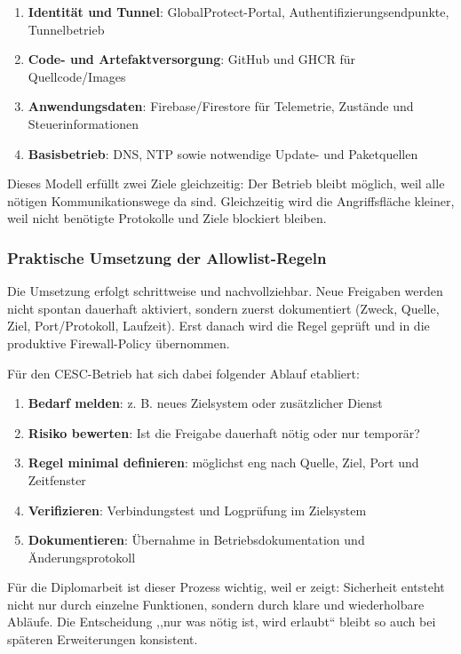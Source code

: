 \begin{enumerate}
    \item \textbf{Identität und Tunnel}: GlobalProtect-Portal, Authentifizierungsendpunkte, Tunnelbetrieb
    \item \textbf{Code- und Artefaktversorgung}: GitHub und GHCR für Quellcode/Images
    \item \textbf{Anwendungsdaten}: Firebase/Firestore für Telemetrie, Zustände und Steuerinformationen
    \item \textbf{Basisbetrieb}: DNS, NTP sowie notwendige Update- und Paketquellen
\end{enumerate}

Dieses Modell erfüllt zwei Ziele gleichzeitig: Der Betrieb bleibt möglich, weil alle nötigen Kommunikationswege da sind. Gleichzeitig wird die Angriffsfläche kleiner, weil nicht benötigte Protokolle und Ziele blockiert bleiben.

\subsubsection{Praktische Umsetzung der Allowlist-Regeln}

Die Umsetzung erfolgt schrittweise und nachvollziehbar. Neue Freigaben werden nicht spontan dauerhaft aktiviert, sondern zuerst dokumentiert (Zweck, Quelle, Ziel, Port/Protokoll, Laufzeit). Erst danach wird die Regel geprüft und in die produktive Firewall-Policy übernommen.

Für den CESC-Betrieb hat sich dabei folgender Ablauf etabliert:

\begin{enumerate}
    \item \textbf{Bedarf melden}: z. B. neues Zielsystem oder zusätzlicher Dienst
    \item \textbf{Risiko bewerten}: Ist die Freigabe dauerhaft nötig oder nur temporär?
    \item \textbf{Regel minimal definieren}: möglichst eng nach Quelle, Ziel, Port und Zeitfenster
    \item \textbf{Verifizieren}: Verbindungstest und Logprüfung im Zielsystem
    \item \textbf{Dokumentieren}: Übernahme in Betriebsdokumentation und Änderungsprotokoll
\end{enumerate}

Für die Diplomarbeit ist dieser Prozess wichtig, weil er zeigt: Sicherheit entsteht nicht nur durch einzelne Funktionen, sondern durch klare und wiederholbare Abläufe. Die Entscheidung ,,nur was nötig ist, wird erlaubt`` bleibt so auch bei späteren Erweiterungen konsistent.

